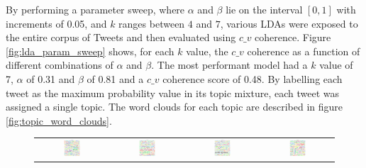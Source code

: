 \documentclass{nws}
\begin{document}
By performing a parameter sweep, where $\alpha$ and $\beta$ lie on the interval
$[0, 1]$ with increments of 0.05, and $k$ ranges between $4$ and $7$, various
LDAs were exposed to the entire corpus of Tweets and then evaluated using $c\_v$
coherence. Figure \ref{fig:lda_param_sweep} shows, for each $k$ value, the $c\_v$ coherence as a
function of different combinations of $\alpha$ and $\beta$. The most performant
model had a $k$ value of 7, $\alpha$ of 0.31 and $\beta$ of 0.81 and a $c\_v$
coherence score of 0.48. By labelling each tweet as the maximum probability
value in its topic mixture, each tweet was assigned a single topic. The word
clouds for each topic are described in figure \ref{fig:topic_word_clouds}.

\begin{figure}[h!]
    \centering
    \begin{tabular}{cccc}
    \includegraphics[width=0.25\textwidth]{Figures/topic_1_wordcloud} &
    \includegraphics[width=0.25\textwidth]{Figures/topic_2_wordcloud} &
    \includegraphics[width=0.25\textwidth]{Figures/topic_3_wordcloud} &
    \includegraphics[width=0.25\textwidth]{Figures/topic_4_wordcloud} \\

\end{tabular}
\end{figure}
\end{document}
